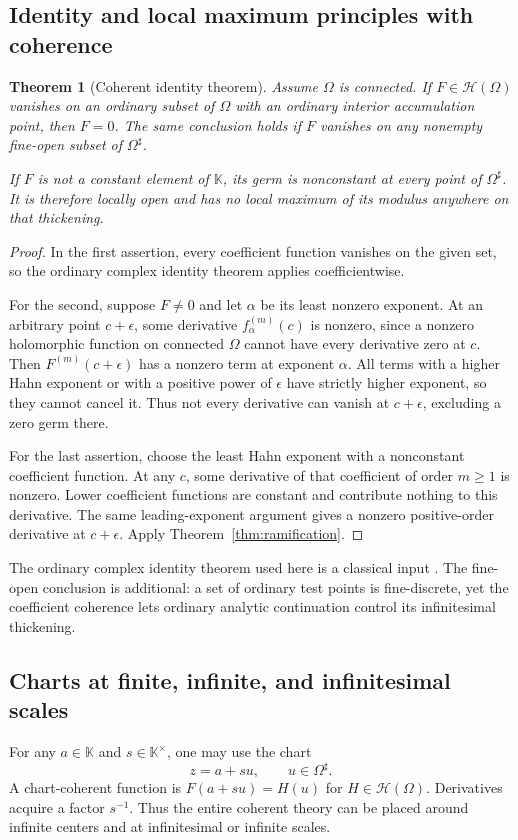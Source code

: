 \documentclass[11pt,a4paper]{article}
\numberwithin{equation}{section}
\newtheorem{theorem}{Theorem}[section]
\theoremstyle{definition}
\theoremstyle{remark}
\newcommand{\K}{\mathbb K}
\newcommand{\HH}{\mathscr H}
\begin{document}
\subsection{Identity and local maximum principles with coherence}
\begin{theorem}[Coherent identity theorem]
\label{thm:identity}
Assume $\Omega$ is connected. If $F\in\HH(\Omega)$ vanishes on an ordinary subset of $\Omega$ with an ordinary interior accumulation point, then $F=0$. The same conclusion holds if $F$ vanishes on any nonempty fine-open subset of $\Omega^\sharp$.

If $F$ is not a constant element of $\K$, its germ is nonconstant at every point of $\Omega^\sharp$. It is therefore locally open and has no local maximum of its modulus anywhere on that thickening.
\end{theorem}
\begin{proof}
In the first assertion, every coefficient function vanishes on the given set, so the ordinary complex identity theorem applies coefficientwise.

For the second, suppose $F\ne0$ and let $\alpha$ be its least nonzero exponent. At an arbitrary point $c+\epsilon$, some derivative $f_\alpha^{(m)}(c)$ is nonzero, since a nonzero holomorphic function on connected $\Omega$ cannot have every derivative zero at $c$. Then $F^{(m)}(c+\epsilon)$ has a nonzero term at exponent $\alpha$. All terms with a higher Hahn exponent or with a positive power of $\epsilon$ have strictly higher exponent, so they cannot cancel it. Thus not every derivative can vanish at $c+\epsilon$, excluding a zero germ there.

For the last assertion, choose the least Hahn exponent with a nonconstant coefficient function. At any $c$, some derivative of that coefficient of order $m\geq1$ is nonzero. Lower coefficient functions are constant and contribute nothing to this derivative. The same leading-exponent argument gives a nonzero positive-order derivative at $c+\epsilon$. Apply Theorem~\ref{thm:ramification}.
\end{proof}
The ordinary complex identity theorem used here is a classical input \cite{Ahlfors}. The fine-open conclusion is additional: a set of ordinary test points is fine-discrete, yet the coefficient coherence lets ordinary analytic continuation control its infinitesimal thickening.

\subsection{Charts at finite, infinite, and infinitesimal scales}
For any $a\in\K$ and $s\in\K^\times$, one may use the chart
\[
 z=a+su,\qquad u\in\Omega^\sharp.
\]
A chart-coherent function is $F(a+su)=H(u)$ for $H\in\HH(\Omega)$. Derivatives acquire a factor $s^{-1}$. Thus the entire coherent theory can be placed around infinite centers and at infinitesimal or infinite scales.
\end{document}
